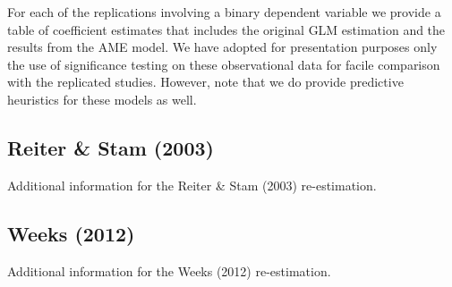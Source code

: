 \documentclass[12pt]{amsart}
\begin{document}
For each of the replications involving a binary dependent variable we provide a table of coefficient estimates that includes the original GLM estimation and the results from the AME model.  We have adopted for presentation purposes only the use of significance testing on these observational data for facile comparison with the replicated studies.  However, note that we do provide predictive heuristics for these models as well.


\clearpage
\subsection*{Reiter \& Stam (2003)}

Additional information for the Reiter \& Stam (2003) re-estimation.


\FloatBarrier

\FloatBarrier
\clearpage

\subsection*{Weeks (2012)}

Additional information for the Weeks (2012) re-estimation.


\FloatBarrier

\FloatBarrier
\clearpage
\end{document}
